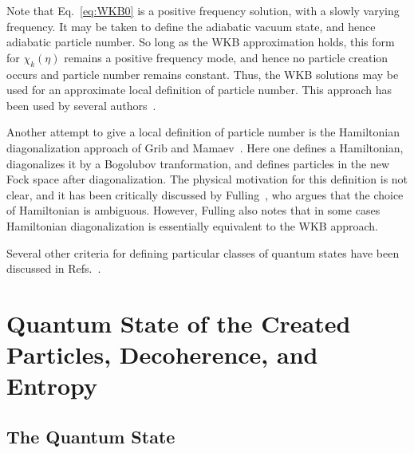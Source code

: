 \documentclass[12pt,onecolumn,eqsecnum,floats,aps,prd,floatfix,titlepage,tightenlines]{revtex4-2}
\begin{document}
Note that Eq.~\eqref{eq:WKB0} is a positive frequency solution, with a slowly varying frequency. It may be taken to define the adiabatic vacuum
state, and hence adiabatic particle number. So long as the WKB approximation holds, this form for $\chi_k(\eta)$ remains a positive frequency mode,
and hence no particle creation occurs and particle number remains constant. Thus, the WKB solutions may be used for an approximate local
definition of particle number. This approach has been used by several authors~\cite{Woodhouse76,Berger78,Azuma83,Winitzki05,Parker12,Agullo15}.

Another attempt to give a local definition of particle number is the Hamiltonian diagonalization approach of Grib and Mamaev~\cite{Grib69}. Here one
defines a Hamiltonian, diagonalizes it by a Bogolubov tranformation, and defines particles in the new Fock space after diagonalization. The physical
motivation for this definition is not clear, and it has been critically discussed by Fulling~\cite{Fulling79}, who argues that the choice of Hamiltonian
is ambiguous. However, Fulling also notes that in some cases Hamiltonian diagonalization is essentially equivalent to the WKB approach. 

Several other criteria for defining particular classes of quantum states have been discussed in Refs.~\cite{Dray83,Degner,AP-Lim03,Raine75}.
 

\section{Quantum State of the Created Particles, Decoherence, and Entropy}
\label{sec:state-entropy}

\subsection{The Quantum State}
\label{sec:state}
\end{document}
